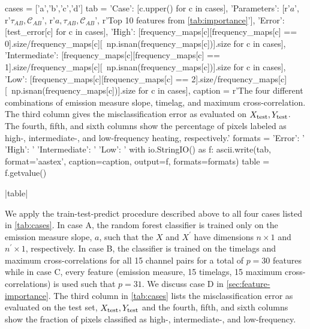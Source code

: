 
\begin{pycode}[manager_ml]
cases = ['a','b','c','d']
tab = {
    'Case': [c.upper() for c in cases],
    'Parameters': [r'$a$', r'$\tau_{AB},\mathcal{C}_{AB}$', r'$a,\tau_{AB},\mathcal{C}_{AB}$', r'Top 10 features from \autoref{tab:importance}'],
    'Error': [test_error[c] for c in cases],
    'High': [frequency_maps[c][frequency_maps[c] == 0].size/frequency_maps[c][~np.isnan(frequency_maps[c])].size for c in cases],
    'Intermediate': [frequency_maps[c][frequency_maps[c] == 1].size/frequency_maps[c][~np.isnan(frequency_maps[c])].size for c in cases],
    'Low': [frequency_maps[c][frequency_maps[c] == 2].size/frequency_maps[c][~np.isnan(frequency_maps[c])].size for c in cases],
}
caption = r'The four different combinations of emission measure slope, timelag, and maximum cross-correlation. The third column gives the misclassification error as evaluated on $X_\textup{test},Y_\textup{test}$. The fourth, fifth, and sixth columns show the percentage of pixels labeled as high-, intermediate-, and low-frequency heating, respectively.\label{tab:cases}'
formats = {
    'Error': '%
    'High': '%
    'Intermediate': '%
    'Low': '%
}
with io.StringIO() as f:
    ascii.write(tab, format='aastex', caption=caption, output=f, formats=formats)
    table = f.getvalue()
\end{pycode}
\py[manager_ml]|table|

We apply the train-test-predict procedure described above to all four cases listed in \autoref{tab:cases}. In case A, the random forest classifier is trained only on the emission measure slope, $a$, such that the $X$ and $X^\prime$ have dimensions $n\times1$ and $n^\prime\times1$, respectively. In case B, the classifier is trained on the timelags and maximum cross-correlations for all 15 channel pairs for a total of $p=30$ features while in case C, every feature (emission measure, 15 timelags, 15 maximum cross-correlations) is used such that $p=31$. We discuss case D in \autoref{sec:feature-importance}. The third column in \autoref{tab:cases} lists the misclassification error as evaluated on the test set, $X_\textup{test},Y_\textup{test}$ and the fourth, fifth, and sixth columns show the fraction of pixels classified as high-, intermediate-, and low-frequency.

